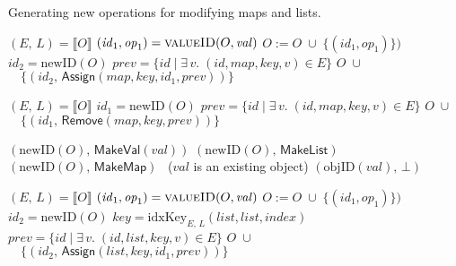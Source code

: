 \begin{algorithm}
\caption{Generating new operations for modifying maps and lists.}\label{fig:pseudocode}
\noindent
\renewcommand\algorithmicindent{10pt}
\begin{minipage}[t]{0.5\textwidth}
\begin{algorithmic}[0]
    \State $(E,\, L) = \llbracket O \rrbracket$
    \State $(\mathit{id}_1, \mathit{op}_1) = \Call{valueID}{O, \mathit{val}}$
    \State $O := O \;\cup\; \big\{ (\mathit{id}_1, \mathit{op}_1) \big\})$
    \EndIf
    \State $\mathit{id}_2 = \mathrm{newID}(O)$
    \State $\mathit{prev} = \{ \mathit{id} \mid \exists\,v.\; (\mathit{id}, \mathit{map}, \mathit{key}, v) \in E \}$
    \State \Return $O \;\cup$
    \State $\quad\big\{ (\mathit{id}_2,\, \mathsf{Assign}(\mathit{map}, \mathit{key}, \mathit{id}_1, \mathit{prev})) \big\}$
    \EndFunction\Statex

    \State $(E,\, L) = \llbracket O \rrbracket$
    \State $\mathit{id}_1 = \mathrm{newID}(O)$
    \State $\mathit{prev} = \{ \mathit{id} \mid \exists\,v.\; (\mathit{id}, \mathit{map}, \mathit{key}, v) \in E \}$
    \State \Return $O \;\cup$
    \State $\quad\big\{ (\mathit{id}_1,\, \mathsf{Remove}(\mathit{map}, \mathit{key}, \mathit{prev})) \big\}$
    \EndFunction\Statex

    \State \Return $(\mathrm{newID}(O),\, \mathsf{MakeVal}(\mathit{val}))$
    \State \Return $(\mathrm{newID}(O),\, \mathsf{MakeList})$
    \State \Return $(\mathrm{newID}(O),\, \mathsf{MakeMap})$
    \Else ~($\mathit{val}$ is an existing object)
    \State \Return $(\mathrm{objID}(\mathit{val}),\, \bot)$
    \EndIf
    \EndFunction
\end{algorithmic}
\end{minipage}%
\begin{minipage}[t]{0.5\textwidth}
\begin{algorithmic}[0]
    \State $(E,\, L) = \llbracket O \rrbracket$
    \State $(\mathit{id}_1, \mathit{op}_1) = \Call{valueID}{O, \mathit{val}}$
    \State $O := O \;\cup\; \big\{ (\mathit{id}_1, \mathit{op}_1) \big\})$
    \EndIf
    \State $\mathit{id}_2 = \mathrm{newID}(O)$
    \State $\mathit{key} = \mathrm{idxKey}_{E,\, L}(\mathit{list}, \mathit{list}, \mathit{index})$
    \State $\mathit{prev} = \{ \mathit{id} \mid \exists\,v.\; (\mathit{id}, \mathit{list}, \mathit{key}, v) \in E \}$
    \State \Return $O \;\cup$
    \State $\quad\big\{ (\mathit{id}_2,\, \mathsf{Assign}(\mathit{list}, \mathit{key}, \mathit{id}_1, \mathit{prev})) \big\}$
    \EndFunction\Statex


\end{algorithmic}
\end{minipage}
\end{algorithm}
